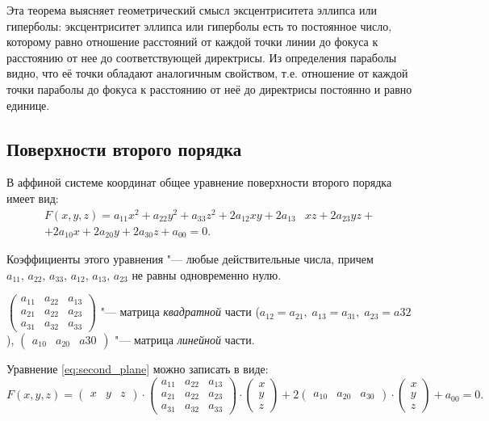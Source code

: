 Эта теорема выясняет геометрический смысл эксцентриситета эллипса
или гиперболы: эксцентриситет эллипса или гиперболы есть то постоянное
число, которому равно отношение расстояний от каждой точки линии до фокуса к расстоянию от нее до соответствующей директрисы. Из определения
параболы видно, что её точки обладают аналогичным свойством, т.е. отношение от каждой точки параболы до фокуса к расстоянию от неё до директрисы
постоянно и равно единице.

\subsection*{Поверхности второго порядка}
\begin{definition}
  
  В аффиной системе координат общее уравнение поверхности второго порядка имеет вид:
  \begin{align}
    \label{eq:second_plane}
    F(x,y,z) = a_{11}x^2 + a_{22}y^2 + a_{33}z^2 + 2a_{12}xy + 2a_{13}&xz + 2a_{23}yz+\\ + 2a_{10}x + 2a_{20}y +2a_{30}z + a_{00} = 0. \nonumber
  \end{align}
\end{definition}

Коэффициенты этого уравнения "--- любые действительные числа, причем $a_{11}, \, a_{22}, \, a_{33}, \, a_{12}, \, a_{13}, \, a_{23}$ не равны одновременно нулю.

$\begin{pmatrix}
  a_{11} & a_{22} & a_{13} \\
  a_{21} & a_{22} & a_{23} \\
  a_{31} & a_{32} & a_{33} 
\end{pmatrix}$ "--- матрица \textit{квадратной} части ($a_{12} = a_{21}, \; a_{13} = a_{31}, \; a_{23} = a{32}$),
$\begin{pmatrix} a_{10} & a_{20} & a{30} \end{pmatrix}$ "--- матрица \textit{линейной} части.

Уравнение \ref{eq:second_plane} можно записать в виде:
$$
  F(x,y,z) = \begin{pmatrix} x & y & z \end{pmatrix} \cdot \begin{pmatrix}
    a_{11} & a_{22} & a_{13} \\
    a_{21} & a_{22} & a_{23} \\
    a_{31} & a_{32} & a_{33}
  \end{pmatrix} \cdot \begin{pmatrix}
    x \\ y \\ z
  \end{pmatrix} + 2 \begin{pmatrix}
    a_{10} & a_{20} & a_{30}
  \end{pmatrix} \cdot \begin{pmatrix}
    x \\ y \\ z
  \end{pmatrix} + a_{00} = 0.
$$

